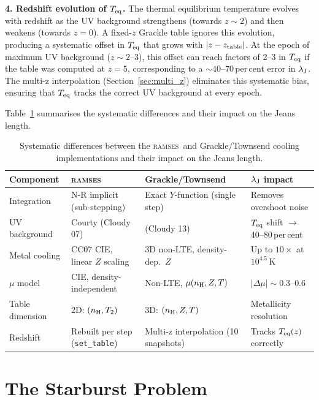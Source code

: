 \documentclass[fleqn,usenatbib]{mnras}
\newcommand{\lJ}{\lambda_{\rm J}}
\newcommand{\ramses}{\textsc{ramses}}
\newcommand{\code}[1]{\texttt{#1}}
\begin{document}
\textbf{4. Redshift evolution of $T_{\rm eq}$.}
The thermal equilibrium temperature evolves with redshift as the UV
background strengthens (towards $z \sim 2$) and then weakens (towards
$z = 0$).  A fixed-$z$ Grackle table ignores this evolution, producing
a systematic offset in $T_{\rm eq}$ that grows with $|z - z_{\rm table}|$.
At the epoch of maximum UV background ($z \sim 2$--$3$), this offset
can reach factors of 2--3 in $T_{\rm eq}$ if the table was computed at
$z = 5$, corresponding to a $\sim 40$--$70$\,per\,cent error in $\lJ$.
The multi-z interpolation (Section~\ref{sec:multi_z}) eliminates this
systematic bias, ensuring that $T_{\rm eq}$ tracks the correct UV
background at every epoch.

Table~\ref{tab:cool_summary} summarises the systematic differences
and their impact on the Jeans length.

\begin{table}
\centering
\caption{Systematic differences between the \ramses\ and
Grackle/Townsend cooling implementations and their impact on the
Jeans length.}
\label{tab:cool_summary}
\begin{tabular}{llll}
\toprule
Component & \ramses & Grackle/Townsend & $\lJ$ impact \\
\midrule
Integration & N-R implicit (sub-stepping) &
  Exact $Y$-function (single step) & Removes overshoot noise \\
UV background & Courty (Cloudy 07) &
  \citet{HM2012} (Cloudy 13) & $T_{\rm eq}$ shift $\to$ 40--80\,per\,cent \\
Metal cooling & CC07 CIE, linear $Z$ scaling &
  3D non-LTE, density-dep.\ $Z$ & Up to $10\times$ at $10^{4.5}$\,K \\
$\mu$ model & CIE, density-independent &
  Non-LTE, $\mu(n_{\rm H}, Z, T)$ & $|\Delta\mu| \sim 0.3$--$0.6$ \\
Table dimension & 2D: $(n_{\rm H}, T_2)$ &
  3D: $(n_{\rm H}, Z, T)$ & Metallicity resolution \\
Redshift & Rebuilt per step (\code{set\_table}) &
  Multi-z interpolation (10 snapshots) & Tracks $T_{\rm eq}(z)$ correctly \\
\bottomrule
\end{tabular}
\end{table}



\section{The Starburst Problem}
\label{sec:starburst}
\end{document}
